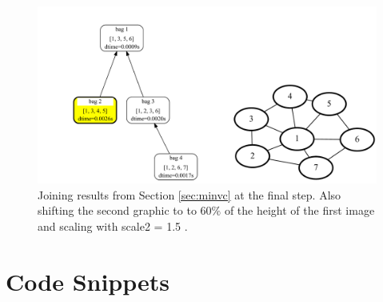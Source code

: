 \documentclass[a4paper, 12pt, bibliography=totoc]{scrartcl}
\begin{document}
\begin{figure}
	\centering
	\includegraphics[width=0.9\linewidth,height=0.9\textheight,keepaspectratio]{images/SVGJOIN/default_06sc15_rise1.pdf}
	\caption{Joining results from Section \ref{sec:minvc} at the final step. Also shifting the second graphic to to $60\%$ of the height of the first image and scaling with scale2 = 1.5 .}
	\label{fig:joinscaledrise5}
\end{figure}

\newpage
\section{Code Snippets}


\end{document}
